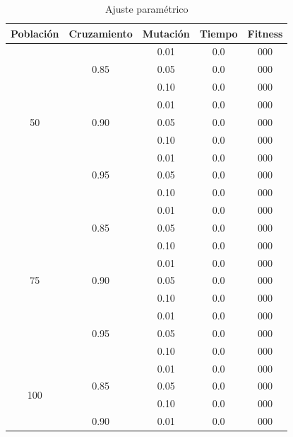 \documentclass[journal]{IEEEtran}
\begin{document}
\begin{table}[h]
\caption{Ajuste paramétrico}
\centering
\begin{tabular}{|c|c|c||c|c|}
\hline
Población &Cruzamiento &Mutación &Tiempo &Fitness \\
\hline
\multirow{9}{*}{ 50} & \multirow{3}{*}{0.85} & 0.01 & 0.0 & 000 \\
                     &                       & 0.05 & 0.0 & 000 \\
                     &                       & 0.10 & 0.0 & 000 \\\cline{2-5}
                     & \multirow{3}{*}{0.90} & 0.01 & 0.0 & 000 \\
                     &                       & 0.05 & 0.0 & 000 \\
                     &                       & 0.10 & 0.0 & 000 \\\cline{2-5}
                     & \multirow{3}{*}{0.95} & 0.01 & 0.0 & 000 \\
                     &                       & 0.05 & 0.0 & 000 \\
                     &                       & 0.10 & 0.0 & 000 \\\hline
\multirow{9}{*}{ 75} & \multirow{3}{*}{0.85} & 0.01 & 0.0 & 000 \\
                     &                       & 0.05 & 0.0 & 000 \\
                     &                       & 0.10 & 0.0 & 000 \\\cline{2-5}
                     & \multirow{3}{*}{0.90} & 0.01 & 0.0 & 000 \\
                     &                       & 0.05 & 0.0 & 000 \\
                     &                       & 0.10 & 0.0 & 000 \\\cline{2-5}
                     & \multirow{3}{*}{0.95} & 0.01 & 0.0 & 000 \\
                     &                       & 0.05 & 0.0 & 000 \\
                     &                       & 0.10 & 0.0 & 000 \\\hline
\multirow{9}{*}{100} & \multirow{3}{*}{0.85} & 0.01 & 0.0 & 000 \\
                     &                       & 0.05 & 0.0 & 000 \\
                     &                       & 0.10 & 0.0 & 000 \\\cline{2-5}
                     & \multirow{3}{*}{0.90} & 0.01 & 0.0 & 000 \\

\end{tabular}
\end{table}
\end{document}
